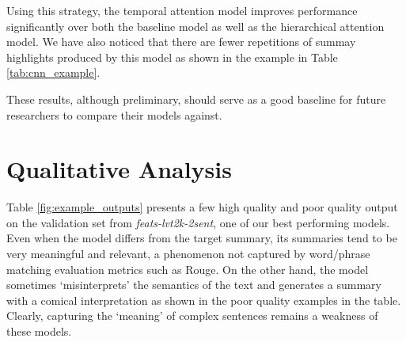 \documentclass[11pt]{article}
\begin{document}
Using this strategy, the temporal attention model improves performance significantly over both the baseline model as well as the hierarchical attention model. We have also noticed that there are fewer repetitions of summay highlights produced by this model as shown in the example in Table \ref{tab:cnn_example}.





These results, although preliminary, should serve as a good baseline for future researchers to compare their models against. 





 \section{Qualitative Analysis}\label{sec:analysis}

Table \ref{fig:example_outputs} presents a few high quality and poor quality output on the validation set from {\it feats-lvt2k-2sent}, one of our best performing models. Even when the model differs from the target summary, its summaries tend to be very meaningful and relevant, a phenomenon not captured by word/phrase matching evaluation metrics such as Rouge. On the other hand, the model sometimes `misinterprets' the semantics of the text and generates a summary with a comical interpretation as shown in the poor quality examples in the table. Clearly, capturing the `meaning' of complex sentences remains a weakness of these models.
\end{document}
